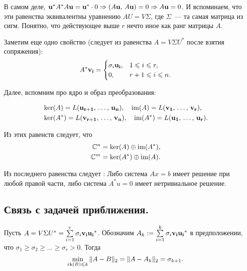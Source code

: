 В самом деле, $\mathbf{u}^*A^*A\mathbf{u}=\mathbf{u}^*\cdot 0\Rightarrow (A\mathbf{u},\,A\mathbf{u})=0\Rightarrow
    A\mathbf{u}=0$. И вспоминаем, что эти равенства эквивалентны уравнению $AU=V\Sigma$, где $\Sigma$~--- та самая матрица из
сигм. Понятно, что действующее выше $r$ нечто иное как ранг матрицы $A$.

Заметим еще одно свойство (следует из равенства $A=V\Sigma U^*$ после взятия сопряжения):
\[
    A^*\mathbf{v_i}=\begin{cases}
        \sigma_i\mathbf{u_i}, & 1\leqslant i\leqslant r,   \\
        0,                  & r+1\leqslant i\leqslant n.
    \end{cases}
\]

Далее, вспомним про ядро и образ преобразования:

\begin{align*}
     & \ker (A)=L(\mathbf{u_{r+1}},\, \ldots,\, \mathbf{u_n}),\quad \operatorname{im}(A)=L(\mathbf{v_1},\,\ldots,\,\mathbf{v_r}),     \\
     & \ker (A^*)=L(\mathbf{v_{r+1}},\, \ldots,\, \mathbf{v_n}),\quad \operatorname{im}(A^*)=L(\mathbf{u_1},\,\ldots,\,\mathbf{u_r}).
\end{align*}

Из этих равенств следует, что
\begin{align*}
    \mathbb{C}^n & =\ker(A)\oplus\operatorname{im}(A^*), \\
    \mathbb{C}^m & =\ker(A^*)\oplus\operatorname{im}(A).
\end{align*}


\begin{remark}
    Из последнего равенства следует :
    Либо система $Ax=b$ имеет решение при любой правой части, либо система $A^*u=0$ имеет нетривиальное решение.    
\end{remark}


\subsection{Связь с задачей приближения.}

\begin{theorem}
    \label{lect3:last}
    Пусть $A=V\Sigma U^*=\sum\limits_{i=1}^r\sigma_i\mathbf{v_i}\mathbf{u_i}^*$. Обозначим 
    $A_k:=\sum\limits_{i=1}^k\sigma_i\mathbf{v_i}\mathbf{u_i}^*$ в предположении, что 
    $\sigma_1\geqslant \sigma_2\geqslant\ldots\geqslant \sigma_r>0$.
    Тогда \[
        \min_{\operatorname{rk}(B)\leqslant k} \|A-B\|_2=\|A-A_k\|_2=\sigma_{k+1}.
    \]
\end{theorem}

